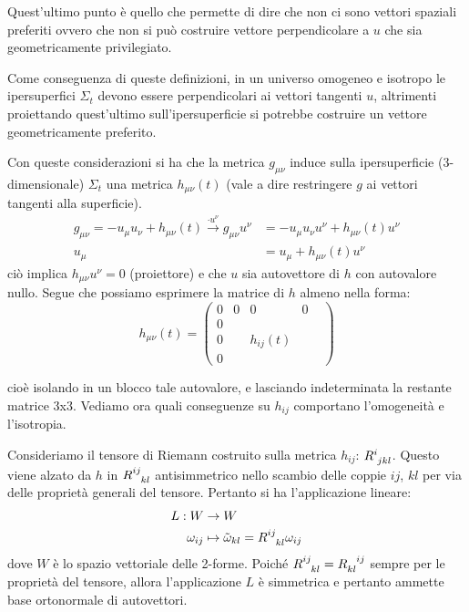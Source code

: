 Quest'ultimo punto è quello che permette di dire che non ci sono vettori spaziali preferiti ovvero che non si può costruire vettore perpendicolare a $u$ che sia geometricamente privilegiato.

Come conseguenza di queste definizioni, in un universo omogeneo e isotropo le ipersuperfici $\Sigma_t$ devono essere perpendicolari ai vettori tangenti $u$, altrimenti proiettando quest'ultimo sull'ipersuperficie si potrebbe costruire un vettore geometricamente preferito.

Con queste considerazioni si ha che la metrica $g_{\mu\nu}$ induce sulla ipersuperficie (3-dimensionale) $\Sigma_t$ una metrica $h_{\mu\nu}(t)$ (vale a dire restringere $g$ ai vettori tangenti alla superficie).
\begin{align*}
    g_{\mu\nu} = -u_\mu u_\nu +h_{\mu\nu}(t)  \overset{\cdot u^\nu}{\longrightarrow} g_{\mu\nu} u^\nu &= -u_\mu u_\nu u^\nu + h_{\mu\nu}(t)u^\nu \\
     u_\mu &= u_\mu + h_{\mu\nu}(t)u^\nu
\end{align*}
ciò implica $ h_{\mu\nu} u^\nu = 0$ (proiettore) e che $u$ sia autovettore di $h$ con autovalore nullo. Segue che possiamo esprimere la matrice di $h$ almeno nella forma:
\begin{equation*}
    h_{\mu\nu}(t) =
  \begin{pmatrix}
  0 & 0 & 0& 0 \\
  0& & & & \\
  0& &   h_{ij}(t)& & \\
  0& & & &
  \end{pmatrix}
\end{equation*}

cioè isolando in un blocco tale autovalore, e lasciando indeterminata la restante matrice 3x3. Vediamo ora quali conseguenze su $h_{ij}$ comportano l'omogeneità e l'isotropia.

Consideriamo il tensore di Riemann costruito sulla metrica $h_{ij}$: $\tensor{R}{^i_{jkl}}$. Questo viene alzato da $h$ in $\tensor{R}{^{ij}_{kl}}$ antisimmetrico nello scambio delle coppie $ij$, $kl$ per via delle proprietà generali del tensore. Pertanto si ha l'applicazione lineare:
\begin{align*}
    L : W &\rightarrow W \\
    \omega_{ij} &\mapsto \tilde{\omega}_{kl} =\tensor{R}{^{ij}_{kl}}\omega_{ij}
\end{align*}
dove $W$ è lo spazio vettoriale delle 2-forme. Poiché $\tensor{R}{^{ij}_{kl}} = \tensor{R}{_{kl}^{ij}}$ sempre per le proprietà del tensore, allora l'applicazione $L$ è simmetrica e pertanto ammette base ortonormale di autovettori.

